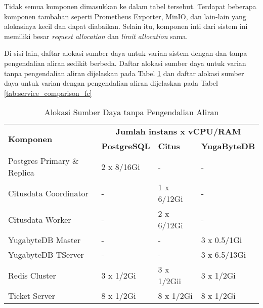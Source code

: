 Tidak semua komponen dimasukkan ke dalam tabel tersebut. Terdapat beberapa komponen tambahan seperti Prometheus Exporter, MinIO, dan lain-lain yang alokasinya kecil dan dapat diabaikan. Selain itu, komponen inti dari sistem ini memiliki besar \textit{request allocation} dan \textit{limit allocation} sama.

Di sisi lain, daftar alokasi sumber daya untuk varian sistem dengan dan tanpa pengendalian aliran sedikit berbeda. Daftar alokasi sumber daya untuk varian tanpa pengendalian aliran dijelaskan pada Tabel \ref{tab:nofc-allocation} dan daftar alokasi sumber daya untuk varian dengan pengendalian aliran dijelaskan pada Tabel \ref{tab:service_comparison_fc}

\begin{table}[htbp]
    \centering
    \caption{Alokasi Sumber Daya tanpa Pengendalian Aliran}
    \label{tab:nofc-allocation}
    \begin{tabular}{|l|l|l|l|}
        \hline
        \multirow{2}{*}{\textbf{Komponen}} & \multicolumn{3}{c|}{\textbf{Jumlah instans x vCPU/RAM}}                                        \\
        \cline{2-4}
                                           & \textbf{PostgreSQL}                                     & \textbf{Citus} & \textbf{YugaByteDB} \\
        \hline
        Postgres Primary \& Replica        & 2 x 8/16Gi                                              & -              & -                   \\ \hline
        Citusdata Coordinator              & -                                                       & 1 x 6/12Gi     & -                   \\ \hline
        Citusdata Worker                   & -                                                       & 2 x 6/12Gi     & -                   \\ \hline
        YugabyteDB Master                  & -                                                       & -              & 3 x 0.5/1Gi         \\ \hline
        YugabyteDB TServer                 & -                                                       & -              & 3 x 6.5/13Gi        \\ \hline
        Redis Cluster                      & 3 x 1/2Gi                                               & 3 x 1/2Gii     & 3 x 1/2Gi           \\ \hline
        Ticket Server                      & 8 x 1/2Gi                                               & 8 x 1/2Gi      & 8 x 1/2Gi           \\ \hline
    \end{tabular}
\end{table}

